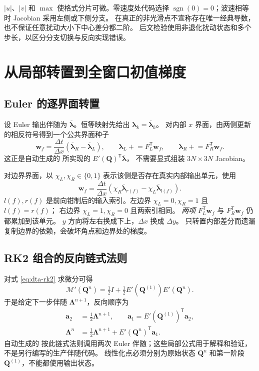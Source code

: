 \documentclass[12pt,a4paper]{article}
\newcommand{\Q}{\mathbf{Q}}
\newcommand{\LL}{\bm{\Lambda}}
\newcommand{\trans}{^{\mathsf T}}
\begin{document}
$|u|$、$|v|$ 和 $\max$ 使格式分片可微。零速度处代码选择
$\operatorname{sgn}(0)=0$；波速相等时 Jacobian 采用左侧或下侧分支。
在真正的非光滑点不宣称存在唯一经典导数，也不保证任意扰动大小下中心差分都二阶。
后文检验使用非退化扰动状态和多个步长，以区分分支切换与反向实现错误。

\section{从局部转置到全窗口初值梯度}
\label{sec:dta-adjoint}

\subsection{Euler 的逐界面转置}

设 Euler 输出伴随为 $\overline{\bm\lambda}$。恒等映射先给出
$\bm\lambda_k=\overline{\bm\lambda}_k$。
对内部 $x$ 界面，由两侧更新的相反符号得到一个公共界面种子
\begin{equation}
 \mathbf w_f=\frac{\Delta t}{\Delta x}
 (\overline{\bm\lambda}_R-\overline{\bm\lambda}_L),\qquad
 \bm\lambda_L\mathrel{+}=F_L\trans\mathbf w_f,\qquad
 \bm\lambda_R\mathrel{+}=F_R\trans\mathbf w_f.
 \label{eq:dta-face-adjoint}
\end{equation}
这正是自动生成的  所实现的 $E'(\Q)\trans\overline{\bm\lambda}$，
不需要显式组装 $3N\times3N$ Jacobian。

对边界界面，以 $\chi_L,\chi_R\in\{0,1\}$ 表示该侧是否存在真实内部输出单元，使用
\begin{equation}
 \mathbf w_f=\frac{\Delta t}{\Delta x}
 (\chi_R\overline{\bm\lambda}_{r(f)}-\chi_L\overline{\bm\lambda}_{l(f)}).
 \label{eq:dta-boundary-adjoint}
\end{equation}
$l(f),r(f)$ 是前向钳制后的输入索引。左边界 $\chi_L=0,\chi_R=1$ 且 $l(f)=r(f)$；
右边界 $\chi_L=1,\chi_R=0$ 且两索引相同。
\emph{两项} $F_L\trans\mathbf w_f$ 与 $F_R\trans\mathbf w_f$ 仍都累加到该单元。
$y$ 方向将左右换成下上，$\Delta x$ 换成 $\Delta y$。
只转置内部差分而遗漏复制边界的依赖，会破坏角点和边界处的梯度。

\subsection{RK2 组合的反向链式法则}

对式 \eqref{eq:dta-rk2} 求微分可得
\begin{equation}
 \mathcal M'(\Q^n)
 =\tfrac12 I+\tfrac12 E'(\Q^{(1)})E'(\Q^n).
 \label{eq:dta-rk-jacobian}
\end{equation}
于是给定下一步伴随 $\LL^{n+1}$，反向顺序为
\begin{align}
 \mathbf a_2&=\tfrac12\LL^{n+1},\qquad
 \mathbf a_1=E'(\Q^{(1)})\trans\mathbf a_2,\nonumber\\
 \LL^n&=\tfrac12\LL^{n+1}+E'(\Q^n)\trans\mathbf a_1.
 \label{eq:dta-rk-adjoint}
\end{align}
自动生成的  按此链式法则调用两次 Euler 伴随；这些局部公式用于解释和验证，不是另行编写的生产伴随代码。
线性化点必须分别为原始状态 $\Q^n$ 和第一阶段 $\Q^{(1)}$，不能都使用输出状态。
\end{document}
